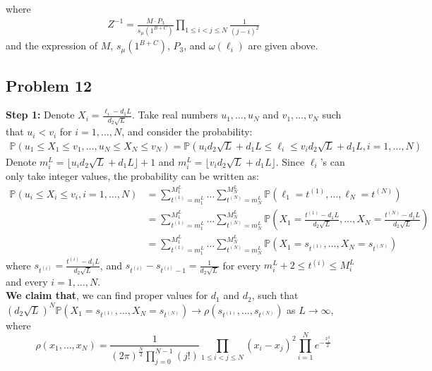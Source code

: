 \documentclass[12pt]{article}
\begin{document}
	where
	\begin{align*}
	Z^{-1}=\frac{M\cdot P_{3}}{s_{\mu}(1^{B+C})}\prod_{1\leqslant i<j\leqslant N}\frac{1}{(j-i)^{2}}
	\end{align*}
	and the expression of $M$, $s_{\mu}(1^{B+C})$, $P_{3}$, and $\omega(\ell_{i})$ are given above.
	
\subsection*{Problem 12}
\textbf{Step 1:} Denote $X_{i}=\frac{\ell_{i}-d_{1}L}{d_{2}\sqrt{L}}$. Take real numbers $u_{1},\dots, u_{N}$ and $v_{1},\dots, v_{N}$ such that $u_{i}<v_{i}$ for $i=1,\dots, N$, and consider the probability: 
\begin{align*}
\mathbb{P}(u_{1}\leqslant X_{1} \leqslant v_{1}, \dots,  u_{N}\leqslant X_{N} \leqslant v_{N})=\mathbb{P}(u_{i}d_{2}\sqrt{L}+d_{1}L\leqslant \ell_{i} \leqslant v_{i}d_{2}\sqrt{L}+d_{1}L, i=1,\dots, N)	
\end{align*}
Denote $m_{i}^{L}=\lfloor u_{i}d_2\sqrt{L}+d_{1}L\rfloor+1$ and $m_{i}^{L}=\lfloor v_{i}d_2\sqrt{L}+d_{1}L\rfloor$. Since $\ell_{i}$'s can only take integer values, the probability can be written as:
\begin{align*}
\mathbb{P}(u_{i}\leqslant X_{i} \leqslant v_{i}, i=1, \dots, N)&=\sum_{t^{(1)}=m_{1}^{L}}^{M_{1}^{L}}\dots\sum_{t^{(N)}=m_{N}^{L}}^{M_{N}^{L}}\mathbb{P}(\ell_{1}=t^{(1)},\dots,\ell_{N}=t^{(N)}) \\&= \sum_{t^{(1)}=m_{1}^{L}}^{M_{1}^{L}}\dots\sum_{t^{(N)}=m_{N}^{L}}^{M_{N}^{L}}\mathbb{P}(X_{1}=\frac{t^{(1)}-d_{1}L}{d_{2}\sqrt{L}},\dots,X_{N}=\frac{t^{(N)}-d_{1}L}{d_{2}\sqrt{L}})\\
&= \sum_{t^{(1)}=m_{1}^{L}}^{M_{1}^{L}}\dots\sum_{t^{(N)}=m_{N}^{L}}^{M_{N}^{L}}\mathbb{P}(X_{1}=s_{t^{(1)}},\dots,X_{N}=s_{t^{(N)}})
\end{align*}
where $s_{t^{(i)}}=\frac{t^{(i)}-d_{1}L}{d_{2}\sqrt{L}}$, and $s_{t^{(i)}}-s_{t^{(i)}-1}=\frac{1}{d_{2}\sqrt{L}}$ for every $m_{i}^{L}+2\leqslant t^{(i)}\leqslant M_{i}^{L}$ and every $i=1,\dots, N$.\\
\textbf{We claim that}, we can find proper values for $d_1$ and $d_{2}$, such that $(d_{2}\sqrt{L})^{N}\mathbb{P}(X_{1}=s_{t^{(1)}},\dots,X_{N}=s_{t^{(N)}})\rightarrow \rho(s_{t^{(1)}},\dots, s_{t^{(N)}})$ as $L\rightarrow\infty$, where $$\rho(x_1,\dots, x_{N})=\frac{1}{(2\pi)^{\frac{N}{2}}\prod_{j=0}^{N-1}(j!)}\prod_{1\leqslant i<j\leqslant N}(x_{i}-x_{j})^2\prod_{i=1}^{N}e^{-\frac{x_{i}^2}{2}}$$ 
\end{document}
